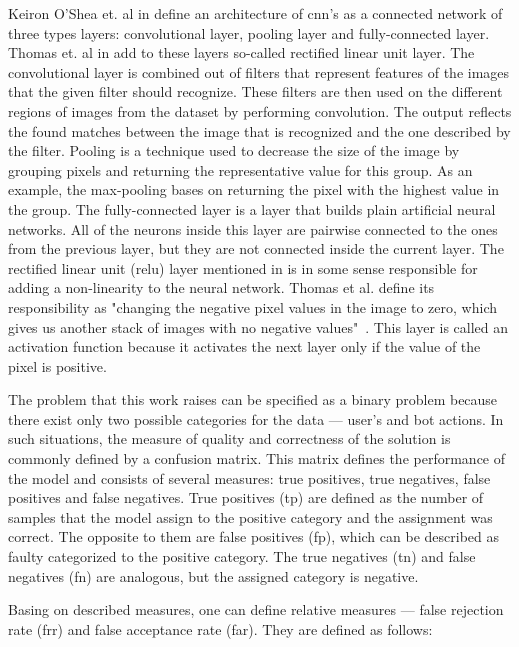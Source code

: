 Keiron O'Shea et. al in \cite{cnn-description} define an architecture of \gls{cnn}'s as a connected network of three types layers: convolutional layer, pooling layer and fully-connected layer.
Thomas et. al in \cite{thomas2020machine} add to these layers so-called rectified linear unit layer.
The convolutional layer is combined out of filters that represent features of the images that the given filter should recognize.
These filters are then used on the different regions of images from the dataset by performing convolution.
The output reflects the found matches between the image that is recognized and the one described by the filter.
Pooling is a technique used to decrease the size of the image by grouping pixels and returning the representative value for this group.
As an example, the max-pooling bases on returning the pixel with the highest value in the group.
The fully-connected layer is a layer that builds plain artificial neural networks.
All of the neurons inside this layer are pairwise connected to the ones from the previous layer, but they are not connected inside the current layer.
The rectified linear unit (\gls{relu}) layer mentioned in \cite{thomas2020machine} is in some sense responsible for adding a non-linearity to the neural network.
Thomas et al. define its responsibility as "changing the negative pixel values in the image to zero, which gives us another stack of images with no negative values"~\cite{thomas2020machine}.
This layer is called an activation function because it activates the next layer only if the value of the pixel is positive.

The problem that this work raises can be specified as a binary problem because there exist only two possible categories for the data --- user's and bot actions.
In such situations, the measure of quality and correctness of the solution is commonly defined by a confusion matrix.
This matrix defines the performance of the model and consists of several measures: true positives, true negatives, false positives and false negatives.
True positives (\gls{tp}) are defined as the number of samples that the model assign to the positive category and the assignment was correct.
The opposite to them are false positives (\gls{fp}), which can be described as faulty categorized to the positive category.
The true negatives (\gls{tn}) and false negatives (\gls{fn}) are analogous, but the assigned category is negative.

Basing on described measures, one can define relative measures --- false rejection rate (\gls{frr}) and false acceptance rate (\gls{far}).
They are defined as follows:

